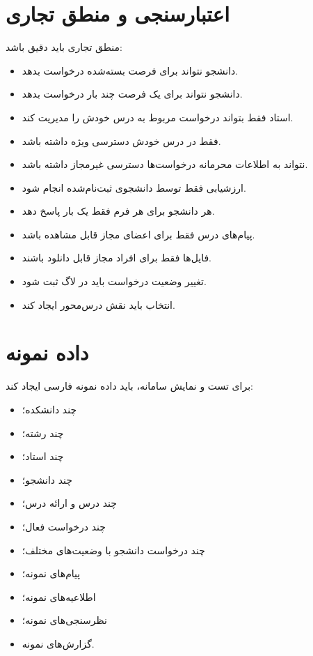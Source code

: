 \documentclass[12pt,a4paper]{article}
\begin{document}
\section{اعتبارسنجی و منطق تجاری}
منطق تجاری باید دقیق باشد:
\begin{itemize}
\item دانشجو نتواند برای فرصت بسته‌شده درخواست بدهد.
\item دانشجو نتواند برای یک فرصت چند بار درخواست بدهد.
\item استاد فقط بتواند درخواست مربوط به درس خودش را مدیریت کند.
\item {} فقط در درس خودش دسترسی ویژه داشته باشد.
\item {} نتواند به اطلاعات محرمانه درخواست‌ها دسترسی غیرمجاز داشته باشد.
\item ارزشیابی فقط توسط دانشجوی ثبت‌نام‌شده انجام شود.
\item هر دانشجو برای هر فرم فقط یک بار پاسخ دهد.
\item پیام‌های درس فقط برای اعضای مجاز قابل مشاهده باشد.
\item فایل‌ها فقط برای افراد مجاز قابل دانلود باشند.
\item تغییر وضعیت درخواست باید در لاگ ثبت شود.
\item انتخاب  باید نقش درس‌محور ایجاد کند.
\end{itemize}

\section{داده نمونه}
برای تست و نمایش سامانه،  باید داده نمونه فارسی ایجاد کند:
\begin{itemize}
\item چند دانشکده؛
\item چند رشته؛
\item چند استاد؛
\item چند دانشجو؛
\item چند درس و ارائه درس؛
\item چند درخواست  فعال؛
\item چند درخواست دانشجو با وضعیت‌های مختلف؛
\item پیام‌های نمونه؛
\item اطلاعیه‌های نمونه؛
\item نظرسنجی‌های نمونه؛
\item گزارش‌های نمونه.
\end{itemize}
\end{document}

